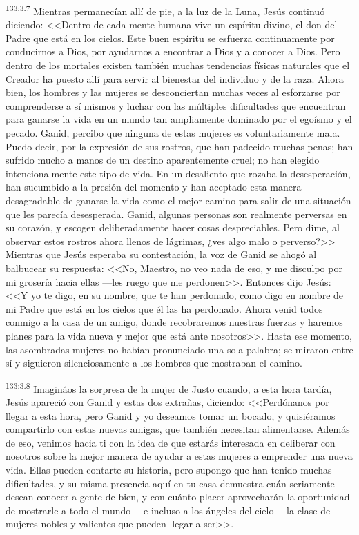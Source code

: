 \par 
\textsuperscript{133:3.7} Mientras permanecían allí de pie, a la luz de la Luna, Jesús continuó diciendo: <<Dentro de cada mente humana vive un espíritu divino, el don del Padre que está en los cielos. Este buen espíritu se esfuerza continuamente por conducirnos a Dios, por ayudarnos a encontrar a Dios y a conocer a Dios. Pero dentro de los mortales existen también muchas tendencias físicas naturales que el Creador ha puesto allí para servir al bienestar del individuo y de la raza. Ahora bien, los hombres y las mujeres se desconciertan muchas veces al esforzarse por comprenderse a sí mismos y luchar con las múltiples dificultades que encuentran para ganarse la vida en un mundo tan ampliamente dominado por el egoísmo y el pecado. Ganid, percibo que ninguna de estas mujeres es voluntariamente mala. Puedo decir, por la expresión de sus rostros, que han padecido muchas penas; han sufrido mucho a manos de un destino aparentemente cruel; no han elegido intencionalmente este tipo de vida. En un desaliento que rozaba la desesperación, han sucumbido a la presión del momento y han aceptado esta manera desagradable de ganarse la vida como el mejor camino para salir de una situación que les parecía desesperada. Ganid, algunas personas son realmente perversas en su corazón, y escogen deliberadamente hacer cosas despreciables. Pero dime, al observar estos rostros ahora llenos de lágrimas, ¿ves algo malo o perverso?>> Mientras que Jesús esperaba su contestación, la voz de Ganid se ahogó al balbucear su respuesta: <<No, Maestro, no veo nada de eso, y me disculpo por mi grosería hacia ellas ---les ruego que me perdonen>>. Entonces dijo Jesús: <<Y yo te digo, en su nombre, que te han perdonado, como digo en nombre de mi Padre que está en los cielos que él las ha perdonado. Ahora venid todos conmigo a la casa de un amigo, donde recobraremos nuestras fuerzas y haremos planes para la vida nueva y mejor que está ante nosotros>>. Hasta ese momento, las asombradas mujeres no habían pronunciado una sola palabra; se miraron entre sí y siguieron silenciosamente a los hombres que mostraban el camino.

\par 
\textsuperscript{133:3.8} Imagináos la sorpresa de la mujer de Justo cuando, a esta hora tardía, Jesús apareció con Ganid y estas dos extrañas, diciendo: <<Perdónanos por llegar a esta hora, pero Ganid y yo deseamos tomar un bocado, y quisiéramos compartirlo con estas nuevas amigas, que también necesitan alimentarse. Además de eso, venimos hacia ti con la idea de que estarás interesada en deliberar con nosotros sobre la mejor manera de ayudar a estas mujeres a emprender una nueva vida. Ellas pueden contarte su historia, pero supongo que han tenido muchas dificultades, y su misma presencia aquí en tu casa demuestra cuán seriamente desean conocer a gente de bien, y con cuánto placer aprovecharán la oportunidad de mostrarle a todo el mundo ---e incluso a los ángeles del cielo--- la clase de mujeres nobles y valientes que pueden llegar a ser>>.

